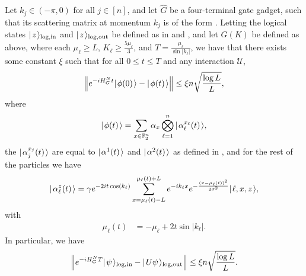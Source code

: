 \documentclass[../thesis-main/thesis-main]{subfiles}
\begin{document}
\begin{lemma}
\label{lem:MP_u_single_qubit_encoded_computation}
  Let $k_j\in (-\pi,0)$ for all $j\in [n]$, and let $\widehat{G}$ be a four-terminal gate gadget, such that its scattering matrix at momentum $k_j$ is of the form .  Letting the logical states $|\mspace{2mu} z \mspace{2mu} \rangle_{\text{log},\text{in}}$ and $|\mspace{2mu} z \mspace{2mu} \rangle_{\text{log},\text{out}}$ be defined as in  and , and let $G(K)$ be defined as above, where each $\mu_\ell \geq L $, $K_\ell \geq \frac{5 \mu_\ell}{3}$, and $T = \frac{\mu_\ell}{\sin |k_\ell|}$, we have that there exists some constant $\xi$ such that for all $0 \leq t \leq T$ and any interaction $\mathcal{U}$,
\begin{align}
  \Big\Vert e^{-i H_G^N t} |\mspace{2mu} \phi(0) \mspace{2mu} \rangle - |\mspace{2mu} \phi(t) \mspace{2mu} \rangle \Big\Vert \leq \xi n \sqrt{\frac{\log L}{L}},
\end{align}
where
\begin{align}
  |\mspace{2mu} \phi(t) \mspace{2mu} \rangle = \sum_{x\in\mathbb{F}_2^n} \alpha_x \bigotimes_{\ell=1}^n   |\mspace{2mu} \alpha^{x_\ell}_\ell(t) \mspace{2mu} \rangle,
\end{align}
the $|\mspace{2mu} \alpha^{x_j}_j(t) \mspace{2mu} \rangle$ are equal to $|\mspace{2mu} \alpha^1(t) \mspace{2mu} \rangle$ and $|\mspace{2mu} \alpha^2(t) \mspace{2mu} \rangle$ as defined in , and for the rest of the particles we have
\begin{align}
  |\mspace{2mu} \alpha_\ell^z(t) \mspace{2mu} \rangle = \gamma e^{-2it \cos (k_\ell)} \sum_{x = \mu_\ell(t)-L}^{\mu_\ell(t) + L} e^{- i k_\ell x} e^{ - \frac{(x-\mu_\ell(t))^2}{2\sigma^2}} |\mspace{2mu} \ell,x,z \mspace{2mu} \rangle,
\end{align}
with
\begin{align}
  \mu_\ell(t) &= -\mu_\ell + 2t \sin |k_\ell|.
\end{align}
In particular, we have
\begin{align}
  \Big\Vert e^{-i H_G^N T} |\mspace{2mu} \psi \mspace{2mu} \rangle_{\text{log},\text{in}} - |\mspace{2mu} U\psi \mspace{2mu} \rangle_{\text{log},\text{out}}\Big\Vert \leq \xi n\sqrt{\frac{\log L}{L}}.
\end{align}
\end{lemma}
\end{document}
